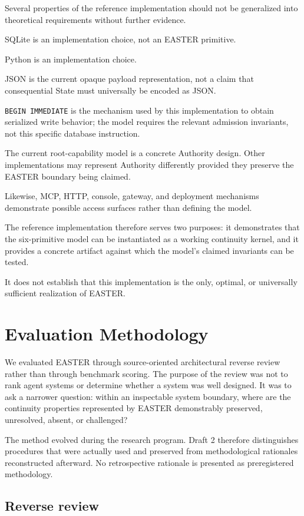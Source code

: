 \documentclass[11pt]{article}
\begin{document}
Several properties of the reference implementation should not be generalized into theoretical requirements without further evidence.

SQLite is an implementation choice, not an EASTER primitive.

Python is an implementation choice.

JSON is the current opaque payload representation, not a claim that consequential State must universally be encoded as JSON.

\texttt{BEGIN IMMEDIATE} is the mechanism used by this implementation to obtain serialized write behavior; the model requires the relevant admission invariants, not this specific database instruction.

The current root-capability model is a concrete Authority design. Other implementations may represent Authority differently provided they preserve the EASTER boundary being claimed.

Likewise, MCP, HTTP, console, gateway, and deployment mechanisms demonstrate possible access surfaces rather than defining the model.

The reference implementation therefore serves two purposes: it demonstrates that the six-primitive model can be instantiated as a working continuity kernel, and it provides a concrete artifact against which the model's claimed invariants can be tested.

It does not establish that this implementation is the only, optimal, or universally sufficient realization of EASTER.
\section{Evaluation Methodology}

We evaluated EASTER through source-oriented architectural reverse review rather than through benchmark scoring. The purpose of the review was not to rank agent systems or determine whether a system was well designed. It was to ask a narrower question: within an inspectable system boundary, where are the continuity properties represented by EASTER demonstrably preserved, unresolved, absent, or challenged?

The method evolved during the research program. Draft 2 therefore distinguishes procedures that were actually used and preserved from methodological rationales reconstructed afterward. No retrospective rationale is presented as preregistered methodology.

\subsection{Reverse review}
\end{document}
